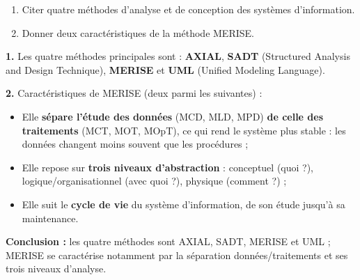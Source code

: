 \documentclass[11pt]{article}
\begin{document}
\begin{exoresolu}
\begin{enumerate}
\item Citer quatre méthodes d'analyse et de conception des systèmes d'information.
\item Donner deux caractéristiques de la méthode MERISE.
\end{enumerate}
\tcblower
\textbf{1.} Les quatre méthodes principales sont : \textbf{AXIAL}, \textbf{SADT} (Structured Analysis and Design Technique), \textbf{MERISE} et \textbf{UML} (Unified Modeling Language).

\textbf{2.} Caractéristiques de MERISE (deux parmi les suivantes) :
\begin{itemize}
\item Elle \textbf{sépare l'étude des données} (MCD, MLD, MPD) \textbf{de celle des traitements} (MCT, MOT, MOpT), ce qui rend le système plus stable : les données changent moins souvent que les procédures ;
\item Elle repose sur \textbf{trois niveaux d'abstraction} : conceptuel (quoi ?), logique/organisationnel (avec quoi ?), physique (comment ?) ;
\item Elle suit le \textbf{cycle de vie} du système d'information, de son étude jusqu'à sa maintenance.
\end{itemize}
\textbf{Conclusion :} les quatre méthodes sont AXIAL, SADT, MERISE et UML ; MERISE se caractérise notamment par la séparation données/traitements et ses trois niveaux d'analyse.
\end{exoresolu}
\end{document}

